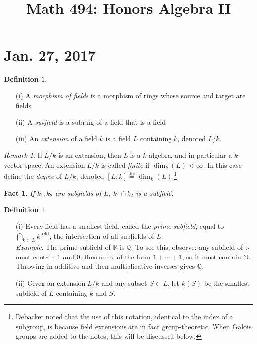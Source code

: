 \documentclass{amsart}
\newcommand{\NN}{\mathbb{N}}
\newcommand{\RR}{\mathbb{R}}
\newcommand{\QQ}{\mathbb{Q}}
\newtheorem{fact}[thm]{Fact}
\theoremstyle{definition}
\newtheorem{defn}[thm]{Definition}
\theoremstyle{remark}
\newtheorem*{rmk}{Remark}
\begin{document}
\title{Math 494: Honors Algebra II}
\maketitle
\tableofcontents

\section{Jan. 27, 2017}

\begin{defn}
\hspace{0.5cm}
\begin{enumerate}
\item[(i)] A \textit{morphism of fields} is a morphism of rings whose source and target are fields
\item[(ii)] A \textit{subfield} is a subring of a field that is a field
\item[(iii)] An \textit{extension} of a field $k$ is a field $L$ containing $k$, denoted $L/k$.
\end{enumerate}
\end{defn}
 
\begin{rmk}
If $L/k$ is an extension, then $L$ is a $k$-algebra, and in particular a $k$-vector space. An extension $L/k$ is called \textit{finite} if $\dim_k(L) < \infty$. In this case define the \textit{degree} of $L/k$, denoted $[L : k] \stackrel{\text{def}}{=} \dim_k(L)$.\footnote{Debacker noted that the use of this notation, identical to the index of a subgroup, is because field extensions are in fact group-theoretic. When Galois groups are added to the notes, this will be discussed below.}
 \end{rmk}
 
\begin{fact}
 If $k_1, k_2$ are subgields of $L$, $k_1 \cap k_2$ is a subfield.
\end{fact}

\begin{defn}
\hspace{0.5cm}
\begin{enumerate}
\item[(i)] Every field has a smallest field, called the \textit{prime subfield}, equal to $\bigcap_{k \subset L} k^{\text{field}}$, the intersection of all subfields of $L$. \\
\textit{Example:} The prime subfield of $\RR$ is $\QQ$. To see this, observe: any subfield of $\RR$ must contain 1 and 0, thus sums of the form $1 + \cdots + 1$, so it must contain $\NN$. Throwing in additive and then multiplicative inverses gives $\QQ$.
\item[(ii)] Given an extension $L/k$ and any subset $S \subset L$, let $k(S)$ be the smallest subfield of $L$ containing $k$ and $S$. 
\end{enumerate}
\end{defn}
\end{document}
